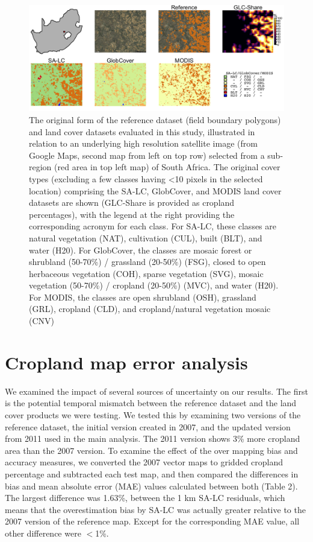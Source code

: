 \documentclass[12pt, titlepage]{article}
\begin{document}
\begin{figure}[!ht]
  \centering
     \includegraphics[width = 17cm]{figures/lc-demo-fig.png} 
      \caption{The original form of the reference dataset (field boundary polygons) and land cover datasets evaluated in this study, illustrated in relation to an underlying high resolution satellite image (from Google Maps, second map from left on top row) selected from a sub-region (red area in top left map) of South Africa. The original cover types (excluding a few classes having <10 pixels in the selected location) comprising the SA-LC, GlobCover, and MODIS land cover datasets are shown (GLC-Share is provided as cropland percentages), with the legend at the right providing the corresponding acronym for each class. For SA-LC, these classes are natural vegetation (NAT), cultivation (CUL), built (BLT), and water (H20). For GlobCover, the classes are mosaic forest or shrubland (50-70\%) / grassland (20-50\%) (FSG), closed to open herbaceous vegetation (COH), sparse vegetation (SVG), mosaic vegetation (50-70\%) / cropland (20-50\%) (MVC), and water (H20). For MODIS, the classes are open shrubland (OSH), grassland (GRL), cropland (CLD), and cropland/natural vegetation mosaic (CNV)}
      \label{fig:lcfig}
\end{figure}


\section{\large Cropland map error analysis}
We examined the impact of several sources of uncertainty on our results.  The first is the potential temporal mismatch between the reference dataset and the land cover products we were testing.  We tested this by examining two versions of the reference dataset, the initial version created in 2007, and the updated version from 2011 used in the main analysis.  The 2011 version shows 3\% more cropland area than the 2007 version. To examine the effect of the over mapping bias and accuracy measures, we converted the 2007 vector maps to gridded cropland percentage and subtracted each test map, and then compared the differences in bias and mean absolute error (MAE) values calculated between both (Table 2). The largest difference was 1.63\%, between the 1 km SA-LC residuals, which means that the overestimation bias by SA-LC was actually greater relative to the 2007 version of the reference map.  Except for the corresponding MAE value, all other difference were $<$1\%. 
\end{document}
